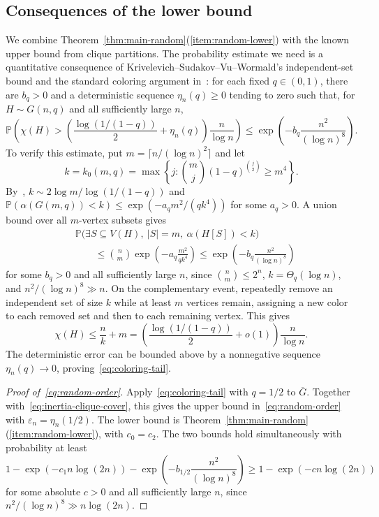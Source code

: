 \documentclass[11pt]{article}
\numberwithin{equation}{section}
\theoremstyle{definition}
\theoremstyle{remark}
\begin{document}
\subsection{Consequences of the lower bound}\label{sec:matching-upper}
We combine Theorem~\ref{thm:main-random}(\ref{item:random-lower}) with
the known upper bound from clique partitions. The probability estimate we need is a
quantitative consequence of Krivelevich--Sudakov--Vu--Wormald's
independent-set bound and the standard coloring argument
in~\cite[Theorem~2.1 and Section~4]{KSVW}: for each fixed $q\in(0,1)$,
there are $b_q>0$ and a deterministic sequence $\eta_n(q)\geq0$
tending to zero such that, for $H\sim G(n,q)$ and all sufficiently
large $n$,
\begin{equation}\label{eq:coloring-tail}
 \mathbb P\!\left(
 \chi(H)>\left(\frac{\log(1/(1-q))}{2}+\eta_n(q)\right)
              \frac{n}{\log n}\right)
 \leq\exp\!\left(-b_q\frac{n^2}{(\log n)^8}\right).
\end{equation}
To verify this estimate, put $m=\lceil n/(\log n)^2\rceil$ and let
\[
 k=k_0(m,q)
 =\max\left\{j:\binom mj(1-q)^{\binom j2}\geq m^4\right\}.
\]
By~\cite[Theorem~2.1]{KSVW},
$k\sim2\log m/\log(1/(1-q))$ and
$\mathbb P(\alpha(G(m,q))<k)\leq\exp(-a_qm^2/(qk^4))$
for some $a_q>0$. A union bound over all $m$-vertex subsets gives
\[
 \begin{aligned}
 &\mathbb P\bigl(\exists S\subseteq V(H),\
     |S|=m,\ \alpha(H[S])<k\bigr)\\
 &\qquad\leq\binom nm
       \exp\!\left(-a_q\frac{m^2}{qk^4}\right)
 \leq\exp\!\left(-b_q\frac{n^2}{(\log n)^8}\right)
 \end{aligned}
\]
for some $b_q>0$ and all sufficiently large $n$, since
$\binom nm\leq2^n$, $k=\Theta_q(\log n)$, and
$n^2/(\log n)^8\gg n$.
On the complementary event, repeatedly remove an independent set
of size $k$ while at least $m$ vertices remain, assigning a new
color to each removed set and then to each remaining vertex.
This gives
\[
 \chi(H)\leq\frac nk+m
 =\left(\frac{\log(1/(1-q))}{2}+o(1)\right)\frac n{\log n}.
\]
The deterministic error can be bounded above by a nonnegative
sequence $\eta_n(q)\to0$, proving~\eqref{eq:coloring-tail}.

\begin{proof}[Proof of~\eqref{eq:random-order}]
Apply~\eqref{eq:coloring-tail} with $q=1/2$ to $\overline G$.
Together with~\eqref{eq:inertia-clique-cover}, this gives the upper
bound in~\eqref{eq:random-order} with $\varepsilon_n=\eta_n(1/2)$.
The lower bound is Theorem~\ref{thm:main-random}(\ref{item:random-lower}),
with $c_0=c_2$.
The two bounds hold simultaneously with probability at least
\[
 1-\exp(-c_1n\log(2n))
   -\exp\!\left(-b_{1/2}\frac{n^2}{(\log n)^8}\right)
 \geq1-\exp(-cn\log(2n))
\]
for some absolute $c>0$ and all sufficiently large $n$, since
$n^2/(\log n)^8\gg n\log(2n)$.
\end{proof}
\end{document}
